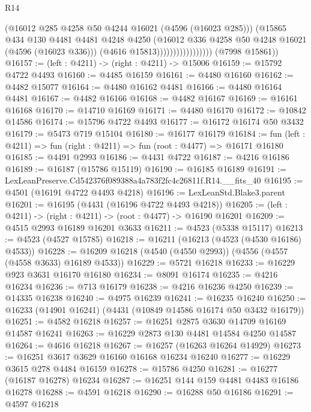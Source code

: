 \begin{lexlean}{R14}
\begin{coremodule}
                                    (@16012 @285 @4258 @50 @4244 @16021 (@4596 (@16023 @285)))
                                    (@15865
                                      @434
                                      @130
                                      @4481
                                      @4481
                                      @4248
                                      @4250
                                      (@16012 @336 @4258 @50 @4248 @16021 (@4596 (@16023 @336)))
                                      (@4616 @15813)))))))))))))))))
      (@7998 @15861))
@16157 := (left : @4211) -> (right : @4211) -> @15006
@16159 := @15792 @4722 @4493
@16160 := @4485 @16159
@16161 := @4480 @16160
@16162 := @4482 @15077
@16164 := @4480 @16162 @4481
@16166 := @4480 @16164 @4481
@16167 := @4482 @16166
@16168 := @4482 @16167
@16169 := @16161 @16168
@16170 := @14710 @16169
@16171 := @4480 @16170
@16172 := @10842 @14586
@16174 := @15796 @4722 @4493
@16177 := @16172 @16174 @50 @3432
@16179 := @5473 @719 @15104
@16180 := @16177 @16179
@16184 := fun (left : @4211) => fun (right : @4211) => fun (root : @4477) => @16171 @16180
@16185 := @4491 @2993
@16186 := @4431 @4722
@16187 := @4216 @16186
@16189 := @16187 (@15786 @15119)
@16190 := @16185 @16189
@16191 := LexLeanPreserve.Cd542376f089388a4a783f2fc4c26811f.R14.__fits_40
@16195 := @4501 (@16191 @4722 @4493 @4218)
@16196 := LexLeanStd.Blake3.parent
@16201 := @16195 (@4431 (@16196 @4722 @4493 @4218))
@16205 := (left : @4211) -> (right : @4211) -> (root : @4477) -> @16190 @16201
@16209 := @4515 @2993 @16189 @16201 @3633
@16211 := @4523 (@5338 @15117)
@16213 := @4523 (@4527 @15785)
@16218 := @16211 (@16213 (@4523 (@4530 @16186) @4533))
@16228 := @16209 @16218 (@4540 (@4550 @2993)) (@4556 (@4557 (@4558 @3633) @16189 @4533))
@16229 := @5721 @16218
@16233 := @16229 @923 @3631 @16170 @16180
@16234 := @8091 @16174
@16235 := @4216 @16234
@16236 := @713 @16179
@16238 := @4216 @16236 @4250
@16239 := @14335 @16238
@16240 := @4975 @16239
@16241 := @16235 @16240
@16250 := @16233 (@14901 @16241) (@4431 (@10849 @14586 @16174 @50 @3432 @16179))
@16251 := @4582 @16218
@16257 := @16251 @2875 @3630 @14709 @16169 @14587 @16241
@16263 := @16229 @2873 @130 @4481 @14584 @4250 @14587
@16264 := @4616 @16218
@16267 := @16257 (@16263 @16264 @14929)
@16273 := @16251 @3617 @3629 @16160 @16168 @16234 @16240
@16277 := @16229 @3615 @278 @4484 @16159
@16278 := @15786 @4250
@16281 := @16277 (@16187 @16278) @16234
@16287 := @16251 @144 @159 @4481 @4483 @16186 @16278
@16288 := @4591 @16218
@16290 := @16288 @50 @16186
@16291 := @4597 @16218

\end{coremodule}
\end{lexlean}
